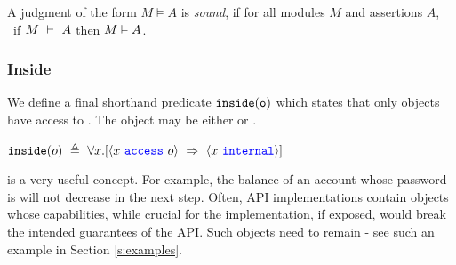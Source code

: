 \begin{definition}
\label{ax:specW-prove-soundness}
A judgment of the form $M \vDash A$ is \emph{sound}, if for all
 modules $M$ and assertions $A$, \ if $M\ \vdash\ A$ then $M \vDash A$.
\end{definition}

 
\subsubsection{Inside}

We define
a final shorthand 
predicate $\texttt{inside}( {\texttt{o}} )$ which states 
that only \internalO objects have access to .
The object  may be either \internalO or \externalO.
\begin{definition}[Inside]
$\wrapped{o}\ \triangleq\ \all{x}{\access{x}{o}\ \Rightarrow\ \internal{x}} $ 
\end{definition}

 
\inside is a very useful concept. For example, the balance of an account whose
  password is \inside  will not decrease in the next step.
  Often, API implementations contain objects whose capabilities, while  crucial for the implementation, if exposed,
would break the intended guarantees of the API. Such objects need to remain \inside - see
such an example in Section \ref{s:examples}. 
 
